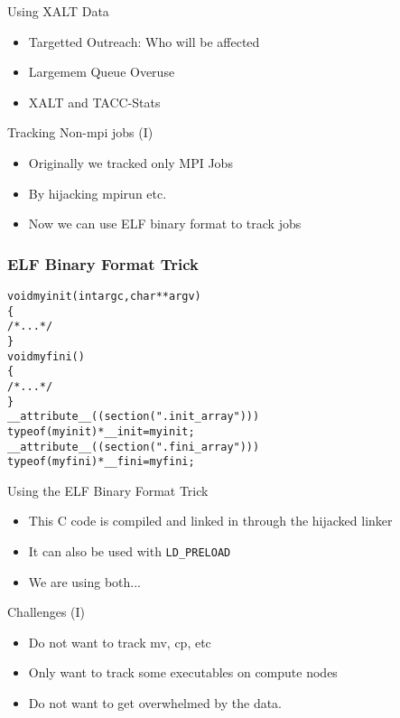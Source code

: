\documentclass{beamer}
\begin{document}
\begin{frame}{Using XALT Data}
  \begin{itemize}
    \item Targetted Outreach: Who will be affected
    \item Largemem Queue Overuse
    \item XALT and TACC-Stats
  \end{itemize}
\end{frame}

\begin{frame}{Tracking Non-mpi jobs (I)}
  \begin{itemize}
    \item Originally we tracked only MPI Jobs
    \item By hijacking mpirun etc.
    \item Now we can use ELF binary format to track jobs
  \end{itemize}
\end{frame}

\begin{frame}[fragile]
    \frametitle{ELF Binary Format Trick}
 {\small
    \begin{alltt}
void myinit(int argc, char **argv)
\{
  /* ... */
\}
void myfini()
\{
  /* ... */
\}
  __attribute__((section(".init_array")))
       typeof(myinit) *__init = myinit;
  __attribute__((section(".fini_array")))
       typeof(myfini) *__fini = myfini;
    \end{alltt}
}
\end{frame}

\begin{frame}{Using the ELF Binary Format Trick}
  \begin{itemize}
    \item This C code is compiled and linked in through the hijacked linker
    \item It can also be used with \texttt{LD\_PRELOAD}
    \item We are using both...
  \end{itemize}
\end{frame}

\begin{frame}{Challenges (I)}
  \begin{itemize}
    \item Do not want to track mv, cp, etc
    \item Only want to track some executables on compute nodes
    \item Do not want to get overwhelmed by the data. 
  \end{itemize}
\end{frame}
\end{document}
